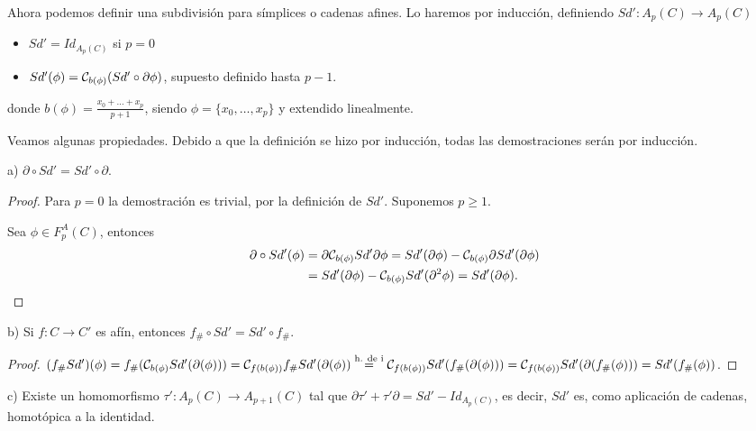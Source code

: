 Ahora podemos definir una subdivisión para símplices o cadenas afines. Lo haremos por inducción, definiendo ${Sd' \colon A_p(C) \to A_p(C)}$
\begin{itemize}
  \item $Sd' = Id_{A_p(C)}$ si $p = 0$
  \item $Sd'(\phi) = {\mathcal C}_{b(\phi)}(Sd' \circ \partial \phi)$, supuesto definido hasta $p-1$.
\end{itemize}
donde $b(\phi) = \frac{x_0 + \dots + x_p}{p+1}$, siendo $\phi = \{x_0, \dots, x_p\}$ y extendido linealmente.

Veamos algunas propiedades. Debido a que la definición se hizo por inducción, todas las demostraciones serán por inducción.

a) $\partial \circ Sd' = Sd' \circ \partial$.

\begin{proof}
  Para $p = 0$ la demostración es trivial, por la definición de $Sd'$. Suponemos $p \geq 1$.

  Sea $\phi \in F_p^A(C)$, entonces
  \begin{align*}
    \partial \circ Sd'(\phi) &= \partial {\mathcal C}_{b(\phi)} Sd' \partial \phi = Sd'(\partial \phi) - {\mathcal C}_{b(\phi)} \partial Sd'(\partial \phi) \\
    &= Sd'(\partial \phi) - {\mathcal C}_{b(\phi)} Sd'(\partial^2 \phi) = Sd'(\partial \phi).
  \end{align*}
\end{proof}

b) Si $f \colon C \to C'$ es afín, entonces $f_\# \circ Sd' = Sd' \circ f_\#$.

\begin{proof}
  $(f_\# Sd')(\phi) = f_\#({\mathcal C}_{b(\phi)} Sd'(\partial(\phi))) = {\mathcal C}_{f(b(\phi))} f_\# Sd'(\partial(\phi))\\ \stackrel{\text{h. de i}}{=}
  {\mathcal C}_{f(b(\phi))} Sd'(f_\#(\partial(\phi))) = {\mathcal C}_{f(b(\phi))} Sd'(\partial(f_\#(\phi))) = Sd'(f_\#(\phi))$.
\end{proof}

c) Existe un homomorfismo $\tau' \colon A_p(C) \to A_{p+1}(C)$ tal que ${\partial \tau' + \tau' \partial = Sd' - Id_{A_p(C)}}$,
es decir, $Sd'$ es, como aplicación de cadenas, homotópica a la identidad.

